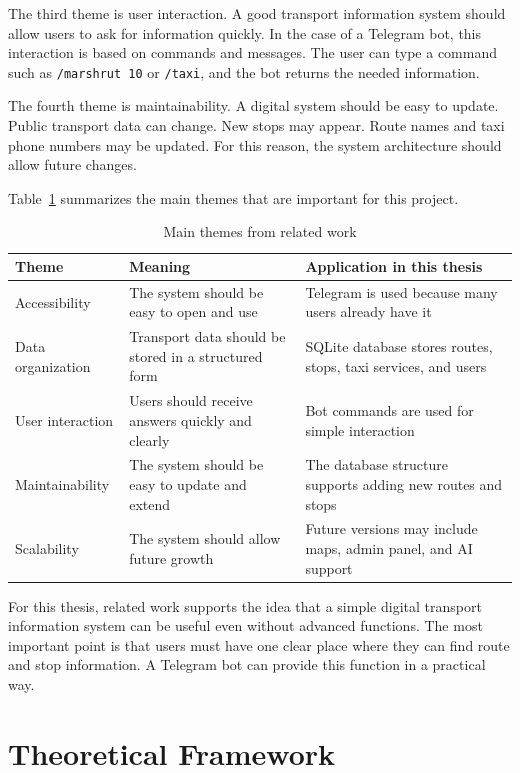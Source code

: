 The third theme is user interaction. A good transport information system should allow users to ask for information quickly. In the case of a Telegram bot, this interaction is based on commands and messages. The user can type a command such as \texttt{/marshrut 10} or \texttt{/taxi}, and the bot returns the needed information.

The fourth theme is maintainability. A digital system should be easy to update. Public transport data can change. New stops may appear. Route names and taxi phone numbers may be updated. For this reason, the system architecture should allow future changes.

Table~\ref{tab:related_work_themes} summarizes the main themes that are important for this project.

\begin{table}[H]
\centering
\caption{Main themes from related work}
\label{tab:related_work_themes}
\begin{tabular}{|p{4cm}|p{6cm}|p{4cm}|}
\hline
\textbf{Theme} & \textbf{Meaning} & \textbf{Application in this thesis} \\
\hline
Accessibility & The system should be easy to open and use & Telegram is used because many users already have it \\
\hline
Data organization & Transport data should be stored in a structured form & SQLite database stores routes, stops, taxi services, and users \\
\hline
User interaction & Users should receive answers quickly and clearly & Bot commands are used for simple interaction \\
\hline
Maintainability & The system should be easy to update and extend & The database structure supports adding new routes and stops \\
\hline
Scalability & The system should allow future growth & Future versions may include maps, admin panel, and AI support \\
\hline
\end{tabular}
\end{table}

For this thesis, related work supports the idea that a simple digital transport information system can be useful even without advanced functions. The most important point is that users must have one clear place where they can find route and stop information. A Telegram bot can provide this function in a practical way. \cite{kamberi2021telegram}\cite{shawar2007chatbots}


\section{Theoretical Framework}
\label{sec:framework}

